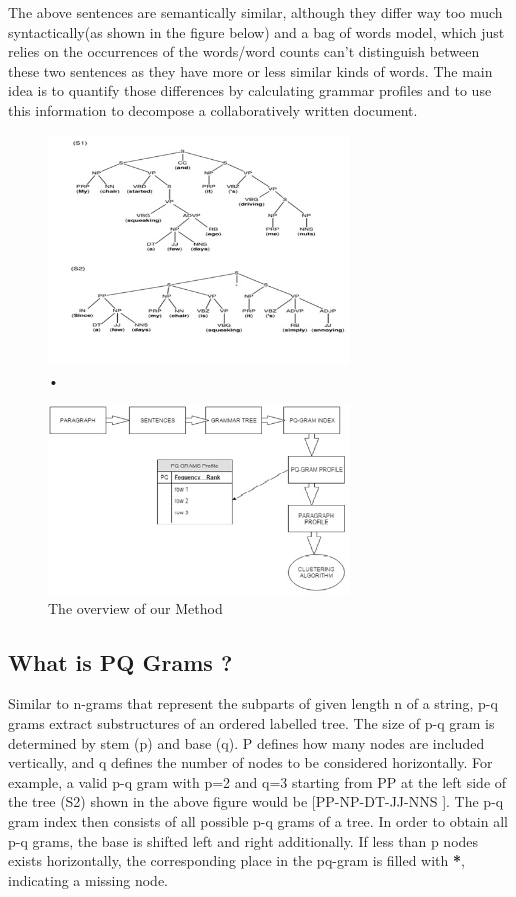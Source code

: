 \documentclass[letterpaper]{article}
\begin{document}
The above sentences are semantically similar, although they differ way too much syntactically(as shown in the figure below) and a bag of words model, which just relies on the occurrences of the words/word counts can’t distinguish between these two sentences as they have more or less similar kinds of words. The main idea is to quantify those differences by calculating grammar profiles and to use this information to decompose a collaboratively written document.
\begin{figure}
\caption{•}
\includegraphics[width=8cm]{u2.jpg}
\end{figure}
\centering
\begin{figure}
\caption{The overview of our Method}
\includegraphics[width=8cm]{u3.jpg}
\centering
\end{figure}

\subsection{What is PQ Grams ?}
Similar to n-grams that represent the subparts of given length n of a string, p-q grams extract substructures of an ordered labelled tree. The size of p-q gram is determined by stem (p) and base (q). P defines how many nodes are included vertically, and q defines the number of nodes to be considered horizontally. For example, a valid p-q gram with p=2 and q=3 starting from PP at the left side of the tree (S2) shown in the above figure would be [PP-NP-DT-JJ-NNS ]. The p-q gram index then consists of all possible p-q grams of a tree. In order to obtain all p-q grams, the base is shifted left and right additionally. If less than p nodes exists horizontally, the corresponding place in the pq-gram is filled with \textbf{*}, indicating a missing node.\\
\end{document}
